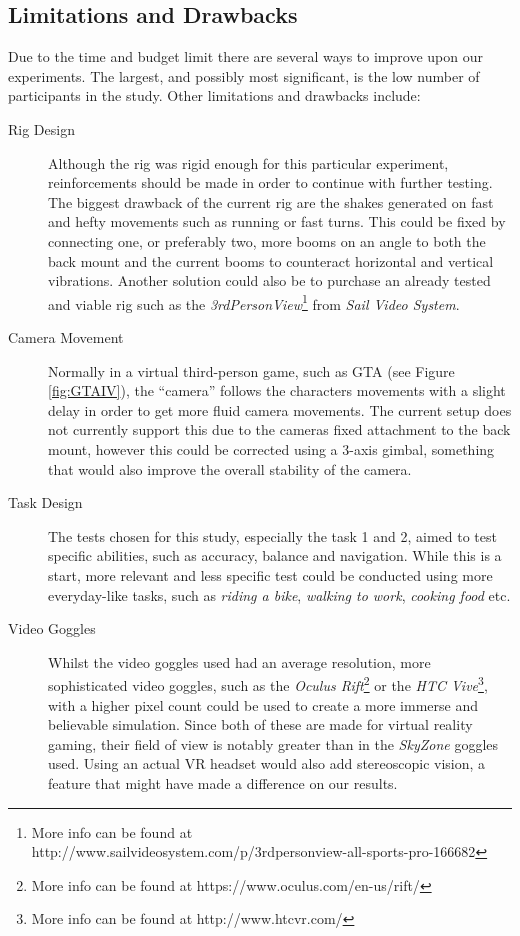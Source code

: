 \documentclass[runningheads,a4paper,oribibl]{llncs}
\begin{document}
\subsection{Limitations and Drawbacks}
Due to the time and budget limit there are several ways to improve upon our experiments. The largest, and possibly most significant, is the low number of participants in the study. Other limitations and drawbacks include:
\begin{description}
	\item[Rig Design] Although the rig was rigid enough for this particular experiment, reinforcements should be made in order to continue with further testing. The biggest drawback of the current rig are the shakes generated on fast and hefty movements such as running or fast turns. This could be fixed by connecting one, or preferably two, more booms on an angle to both the back mount and the current booms to counteract horizontal and vertical vibrations. Another solution could also be to purchase an already tested and viable rig such as the \emph{3rdPersonView}\footnote{More info can be found at http://www.sailvideosystem.com/p/3rdpersonview-all-sports-pro-166682} from \emph{Sail Video System}.

	\item[Camera Movement] Normally in a virtual third-person game, such as GTA (see Figure \ref{fig:GTAIV}), the ``camera'' follows the characters movements with a slight delay in order to get more fluid camera movements. The current setup does not currently support this due to the cameras fixed attachment to the back mount, however this could be corrected using a 3-axis gimbal, something that would also improve the overall stability of the camera.

	\item[Task Design] The tests chosen for this study, especially the task 1 and 2, aimed to test specific abilities, such as accuracy, balance and navigation. While this is a start, more relevant and less specific test could be conducted using more everyday-like tasks, such as \emph{riding a bike}, \emph{walking to work}, \emph{cooking food} etc.

	\item[Video Goggles] Whilst the video goggles used had an average resolution, more sophisticated video goggles, such as the \emph{Oculus Rift}\footnote{More info can be found at https://www.oculus.com/en-us/rift/} or the \emph{HTC Vive}\footnote{More info can be found at http://www.htcvr.com/}, with a higher pixel count could be used to create a more immerse and believable simulation. Since both of these are made for virtual reality gaming, their field of view is notably greater than in the \emph{SkyZone} goggles used. Using an actual VR headset would also add stereoscopic vision, a feature that might have made a difference on our results.


\end{description}
\end{document}
